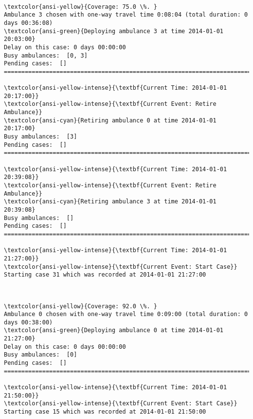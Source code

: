 \documentclass[11pt]{article}
\begin{document}
    \begin{center}
    \end{center}
    { \hspace*{\fill} \\}
    
    \begin{Verbatim}[commandchars=\\\{\}]
\textcolor{ansi-yellow}{Coverage: 75.0 \%. }
Ambulance 3 chosen with one-way travel time 0:08:04 (total duration: 0 days 00:36:08)
\textcolor{ansi-green}{Deploying ambulance 3 at time 2014-01-01 20:03:00}
Delay on this case: 0 days 00:00:00
Busy ambulances:  [0, 3]
Pending cases:  []
========================================================================

\textcolor{ansi-yellow-intense}{\textbf{Current Time: 2014-01-01 20:17:00}}
\textcolor{ansi-yellow-intense}{\textbf{Current Event: Retire Ambulance}}
\textcolor{ansi-cyan}{Retiring ambulance 0 at time 2014-01-01 20:17:00}
Busy ambulances:  [3]
Pending cases:  []
========================================================================

\textcolor{ansi-yellow-intense}{\textbf{Current Time: 2014-01-01 20:39:08}}
\textcolor{ansi-yellow-intense}{\textbf{Current Event: Retire Ambulance}}
\textcolor{ansi-cyan}{Retiring ambulance 3 at time 2014-01-01 20:39:08}
Busy ambulances:  []
Pending cases:  []
========================================================================

\textcolor{ansi-yellow-intense}{\textbf{Current Time: 2014-01-01 21:27:00}}
\textcolor{ansi-yellow-intense}{\textbf{Current Event: Start Case}}
Starting case 31 which was recorded at 2014-01-01 21:27:00

    \end{Verbatim}

    \begin{center}
    \end{center}
    { \hspace*{\fill} \\}
    
    \begin{Verbatim}[commandchars=\\\{\}]
\textcolor{ansi-yellow}{Coverage: 92.0 \%. }
Ambulance 0 chosen with one-way travel time 0:09:00 (total duration: 0 days 00:38:00)
\textcolor{ansi-green}{Deploying ambulance 0 at time 2014-01-01 21:27:00}
Delay on this case: 0 days 00:00:00
Busy ambulances:  [0]
Pending cases:  []
========================================================================

\textcolor{ansi-yellow-intense}{\textbf{Current Time: 2014-01-01 21:50:00}}
\textcolor{ansi-yellow-intense}{\textbf{Current Event: Start Case}}
Starting case 15 which was recorded at 2014-01-01 21:50:00

    \end{Verbatim}
\end{document}
